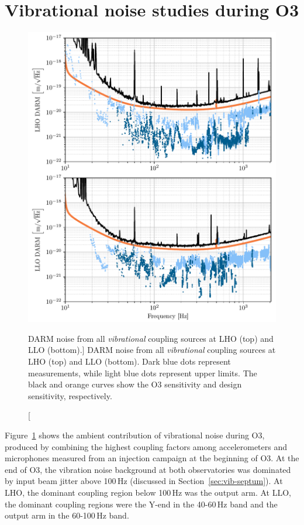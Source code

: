 \section{Vibrational noise studies during O3}\label{sec:vib}

\begin{figure}
	\centering
	\includegraphics{figures/noise-studies/vib-ambient.pdf}
	\caption
	[DARM noise from all \textit{vibrational} coupling sources at LHO (top) and LLO (bottom).]
	{DARM noise from all \textit{vibrational} coupling sources at LHO (top) and LLO (bottom).
	 Dark blue dots represent measurements, while light blue dots represent upper limits.
	 The black and orange curves show the O3 sensitivity and design sensitivity, respectively.
	 }
	\label{fig:vib-ambient}
\end{figure}

Figure~\ref{fig:vib-ambient} shows the ambient contribution of vibrational noise during \ac{O3}, produced by combining the highest coupling factors among accelerometers and microphones measured from an injection campaign at the beginning of \ac{O3}.
At the end of \ac{O3}, the vibration noise background at both observatories was dominated by input beam jitter above 100\,Hz (discussed in Section~\ref{sec:vib-septum}).
At \ac{LHO},  the dominant coupling region below 100\,Hz was the output arm.
At \ac{LLO}, the dominant coupling regions were the Y-end in the 40-60\,Hz band and the output arm in the 60-100\,Hz band.

